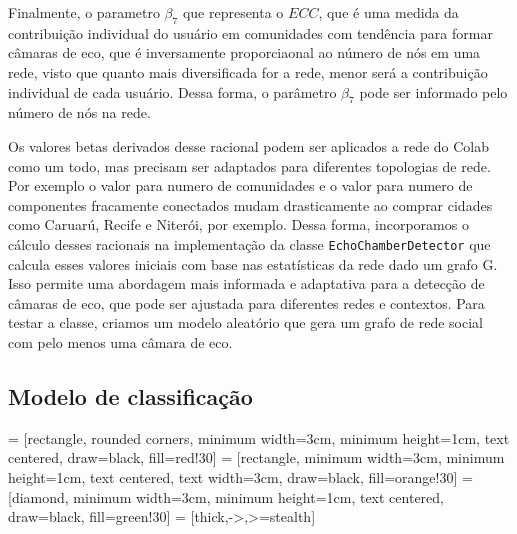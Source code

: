 Finalmente, o parametro $\beta_7$ que representa o $ECC$, que é uma medida da contribuição individual do usuário em comunidades com tendência para formar câmaras de eco, que é inversamente proporciaonal ao número de nós em uma rede, visto que quanto mais diversificada for a rede, menor será a contribuição individual de cada usuário. Dessa forma, o parâmetro $\beta_7$ pode ser informado pelo número de nós na rede.

Os valores betas derivados desse racional podem ser aplicados a rede do Colab como um todo, mas precisam ser adaptados para diferentes topologias de rede. Por exemplo o valor para numero de comunidades e o valor para numero de componentes fracamente conectados mudam drasticamente ao comprar cidades como Caruarú, Recife e Niterói, por exemplo. Dessa forma, incorporamos o cálculo desses racionais na implementação da classe \texttt{EchoChamberDetector} que calcula esses valores iniciais com base nas estatísticas da rede dado um grafo G. Isso permite uma abordagem mais informada e adaptativa para a detecção de câmaras de eco, que pode ser ajustada para diferentes redes e contextos. Para testar a classe, criamos um modelo aleatório que gera um grafo de rede social com pelo menos uma câmara de eco.

\subsection{Modelo de classificação}

 = [rectangle, rounded corners, minimum width=3cm, minimum height=1cm, text centered, draw=black, fill=red!30]
 = [rectangle, minimum width=3cm, minimum height=1cm, text centered, text width=3cm, draw=black, fill=orange!30]
 = [diamond, minimum width=3cm, minimum height=1cm, text centered, draw=black, fill=green!30]
 = [thick,->,>=stealth]


